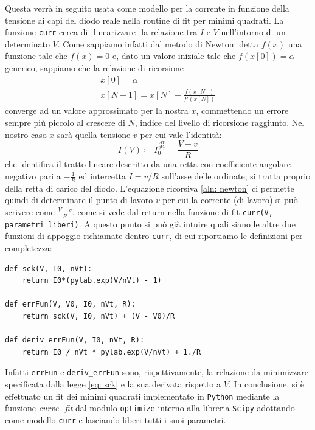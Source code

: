 \documentclass{article}[a4paper, oneside, 11pt]
\begin{document}
Questa verrà in seguito usata come modello per la corrente in funzione della
tensione ai capi del diodo reale nella routine di fit per minimi quadrati.
La funzione \verb'curr' cerca di -linearizzare- la relazione tra $I$ e $V$
nell'intorno di un determinato $V$. Come sappiamo infatti dal metodo di Newton:
detta $f(x)$ una funzione tale che $f(x) = 0$ e, dato un valore iniziale
tale che $f(x[0]) = \alpha$ generico, sappiamo che la relazione di ricorsione
\begin{align}
	x[0] = \alpha \\ \label{aln: newton}
	x[N+1] = x[N] - \frac{f(x[N])}{f'(x[N])}
\end{align}
converge ad un valore approssimato per la nostra $x$, commettendo un errore 
sempre più piccolo al crescere di $N$, indice del livello di ricorsione
raggiunto. 
Nel nostro caso $x$ sarà quella tensione $v$ per cui vale l'identità:
\begin{equation}\label{eq: sck}
	I(V) \coloneqq I_0^{\frac{\Delta V}{\eta V_T}} = \frac{V - v}{R}	
\end{equation}
che identifica il tratto lineare descritto da una retta con coefficiente
angolare negativo pari a $-\frac{1}{R}$ ed intercetta $I = v/R$ 
sull’asse delle ordinate; si tratta proprio della retta di carico del diodo.
L'equazione ricorsiva \eqref{aln: newton} ci permette quindi di determinare
il punto di lavoro $v$ per cui la corrente (di lavoro) si può scrivere come
$\frac{V - v}{R}$, come si vede dal return nella funzione di fit
\verb'curr(V, parametri liberi)'.
A questo punto si può già intuire quali siano le altre due funzioni di
appoggio richiamate dentro \verb'curr', di cui riportiamo le definizioni
per completezza:
\begin{lstlisting}[label={lst: errFun}]
def sck(V, I0, nVt):
    return I0*(pylab.exp(V/nVt) - 1)

def errFun(V, V0, I0, nVt, R):
    return sck(V, I0, nVt) + (V - V0)/R

def deriv_errFun(V, I0, nVt, R):
    return I0 / nVt * pylab.exp(V/nVt) + 1./R
\end{lstlisting}
Infatti \verb'errFun' e \verb'deriv_errFun' sono, rispettivamente, la relazione 
da minimizzare specificata dalla legge \eqref{eq: sck} e la sua derivata
rispetto a $V$.
In conclusione, si è effettuato un fit dei minimi quadrati implementato in
\verb+Python+ mediante la funzione \emph{curve\_fit} dal modulo \verb+optimize+
interno alla libreria \texttt{Scipy}\cite{scipy} adottando come modello
\verb'curr' e lasciando liberi tutti i suoi parametri.
\end{document}
